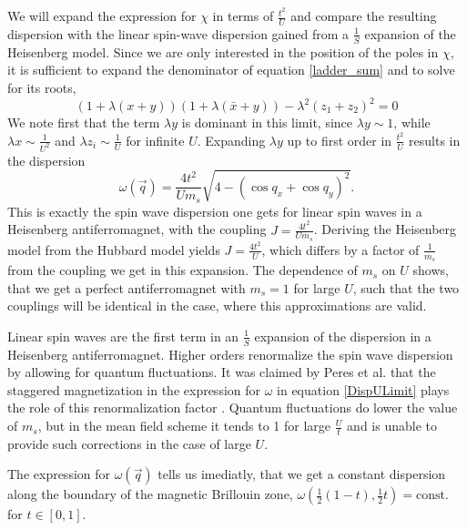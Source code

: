%
%

We will expand the expression for $\chi$ in terms of $\frac{t^2}{U}$ 
and compare the resulting dispersion with the linear spin-wave dispersion gained from a $\frac1S$ expansion of the Heisenberg model.
Since we are only interested in the position of the poles in $\chi$, it is sufficient to expand the denominator of equation \ref{ladder_sum} and to solve for its roots,
\begin{equation}
 \left(1+\lambda(x+y)\right)\left(1+\lambda(\bar x + y)\right) - \lambda^2(z_1 +z_2)^2 = 0
\end{equation}
We note first that the term $\lambda y$ is dominant in this limit, since $\lambda y \sim 1$, while $\lambda x \sim \frac1{U^2}$ and $\lambda z_i \sim \frac1U$
for infinite $U$.
Expanding $\lambda y$
up to first order in  $\frac{t^2}U$ results in the dispersion
\begin{equation}\label{DispULimit}
 \omega(\vec q) = \frac{4t^2}{Um_s}\sqrt{4-(\cos q_x+\cos q_y)^2}. 
\end{equation}
This is exactly the spin wave dispersion one gets for linear spin waves in a Heisenberg antiferromagnet, 
with the coupling $J=\frac{4t^2}{Um_s}$.
Deriving the Heisenberg model from the Hubbard model yields $J=\frac{4t^2}{U}$, which differs by a factor of $\frac1{m_s}$ from the coupling we get in this expansion.
The dependence of $m_s$ on $U$ shows, that we get a perfect antiferromagnet with $m_s=1$ for large $U$, 
such that the two couplings will be identical in the case, where this approximations are valid. 
%

Linear spin waves are the first term in an $\frac1S$ expansion of the dispersion in a Heisenberg antiferromagnet.
Higher orders renormalize the spin wave dispersion by allowing for quantum fluctuations.
It was claimed by Peres et al. that the staggered magnetization in the expression for $\omega$ in equation \ref{DispULimit} 
plays the role of this renormalization factor \cite{PhysRevB.65.132404}.
Quantum fluctuations do lower the value of $m_s$, but in the mean field scheme it tends to 1 for large $\frac Ut$ 
and is unable to provide such corrections in the case of large $U$.

The expression for $\omega(\vec q)$ tells us imediatly, that we get a constant dispersion along the 
boundary of the magnetic Brillouin zone, $\omega(\frac12(1-t), \frac12t) =\mathrm{const.}$ for $t \in [0,1]$.


